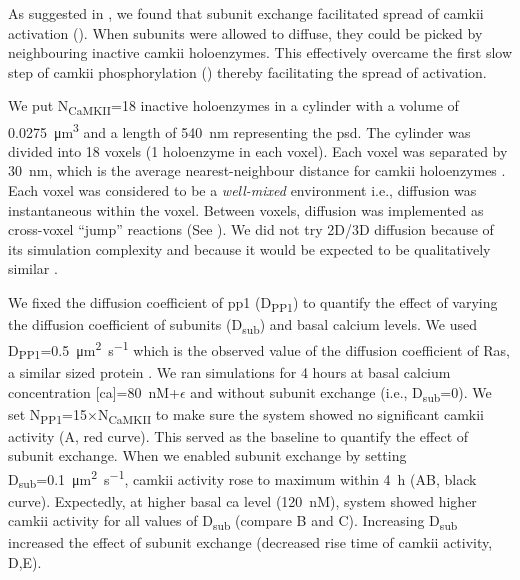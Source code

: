 \documentclass[9pt,lineno,doublespacing]{elife}
\newcommand\SUB[2]{#1\textsubscript{#2}}
\begin{document}
As suggested in \citep{stratton_activation-triggered_2014}, we found that
subunit exchange facilitated spread of \gls{camkii} activation
(). When subunits were allowed to diffuse, they
could be picked by neighbouring inactive \gls{camkii} holoenzymes.  This
effectively overcame the first slow step of \gls{camkii} phosphorylation
() thereby facilitating the spread of activation.

We put \SUB{N}{CaMKII}=18 inactive holoenzymes in a cylinder with a volume of
\SI{0.0275}{\cubic\micro\meter} and a length of \SI{540}{\nano\meter}
representing the \gls{psd}. The cylinder was divided into 18 voxels (1
holoenzyme in each voxel). Each voxel was separated by \SI{30}{\nano\meter},
which is the average nearest-neighbour distance for \gls{camkii} holoenzymes
\citep{feng_quantitative_2011}.  Each voxel was considered to be a
\emph{well-mixed} environment i.e., diffusion was instantaneous within the
voxel. Between voxels, diffusion was implemented as cross-voxel ``jump''
reactions (See ).  We did not try 2D/3D
diffusion because of its simulation complexity and because it would be expected
to be qualitatively similar \citep{fange_stochastic_2010}.

We fixed the diffusion coefficient of \gls{pp1} (\SUB{D}{PP1}) to quantify the
effect of varying the diffusion coefficient of subunits (\SUB{D}{sub}) and basal
calcium levels. We used \SUB{D}{PP1}=\SI{0.5}{\micro\meter\squared\per\second}
which is the observed value of the diffusion coefficient of Ras, a similar sized
protein \citep{harvey_spread_2008}. We ran simulations for 4 hours at basal
calcium concentration [\gls{ca}]=\SI{80}{\nano M}+$\epsilon$ and without subunit
exchange (i.e., \SUB{D}{sub}=0). We set \SUB{N}{PP1}=15$\times$\SUB{N}{CaMKII}
to make sure the system showed no significant \gls{camkii} activity
(A, red curve). This served as the baseline to
quantify the effect of subunit exchange. When we enabled subunit exchange by
setting \SUB{D}{sub}=\SI{0.1}{\micro\meter\squared\per\second}, \gls{camkii}
activity rose to maximum within \SI{4}{\hour}
(AB, black curve). Expectedly, at higher basal
\gls{ca} level (\SI{120}{\nano M}), system showed higher \gls{camkii} activity
for all values of \SUB{D}{sub} (compare B and
C). Increasing \SUB{D}{sub} increased the effect of subunit exchange (decreased
rise time of \gls{camkii} activity, D,E).
\end{document}
